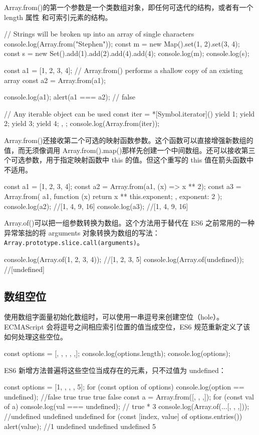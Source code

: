 Array.from()的第一个参数是一个类数组对象，即任何可迭代的结构，或者有一个 length 属性
和可索引元素的结构。
\begin{js}
    // Strings will be broken up into an array of single characters
    console.log(Array.from("Stephen"));
    const m = new Map().set(1, 2).set(3, 4);
    const s = new Set().add(1).add(2).add(4).add(4);
    console.log(m);
    console.log(s);

    const a1 = [1, 2, 3, 4];
    // Array.from() performs a shallow copy of an existing array
    const a2 = Array.from(a1);

    console.log(a1);
    alert(a1 === a2); // false

    // Any iterable object can be used
    const iter = {
    *[Symbol.iterator]() {
            yield 1;
            yield 2;
            yield 3;
            yield 4;
        },
    };
    console.log(Array.from(iter));
\end{js}

Array.from()还接收第二个可选的映射函数参数。这个函数可以直接增强新数组的值，而无须像调用 Array.from().map()那样先创建一个中间数组。还可以接收第三个可选参数，用于指定映射函数中 this 的值。但这个重写的 this 值在箭头函数中不适用。

\begin{js}
    const a1 = [1, 2, 3, 4];
    const a2 = Array.from(a1, (x) => x ** 2);
    const a3 = Array.from(
    a1,
    function (x) {
            return x ** this.exponent;
        },
    { exponent: 2 }
    );
    console.log(a2); //[1, 4, 9, 16]
    console.log(a3); //[1, 4, 9, 16]
\end{js}

Array.of()可以把一组参数转换为数组。这个方法用于替代在 ES6 之前常用的一种异常笨拙的将 arguments 对象转换为数组的写法： \verb|Array.prototype.slice.call(arguments)|。
\begin{js}
    console.log(Array.of(1, 2, 3, 4)); //[1, 2, 3, 5]
    console.log(Array.of(undefined)); //[undefined]
\end{js}
\subsection{数组空位}
使用数组字面量初始化数组时，可以使用一串逗号来创建空位（hole）。ECMAScript 会将逗号之间相应索引位置的值当成空位，ES6 规范重新定义了该如何处理这些空位。
\begin{js}
    const options = [, , , , ,];
    console.log(options.length);
    console.log(options);
\end{js}
ES6 新增方法普遍将这些空位当成存在的元素，只不过值为 undefined：\
\begin{js}
    const options = [1, , , , 5];
    for (const option of options) {
            console.log(option == undefined); //false true true true false
        }
    const a = Array.from([, , ,]);
    for (const val of a) {
            console.log(val === undefined); // true * 3
        }
    console.log(Array.of(...[, , ,])); //undefined undefined undefined
    for (const [index, value] of options.entries()) {
            alert(value); //1 undefined undefined undefined 5
        }
\end{js}

